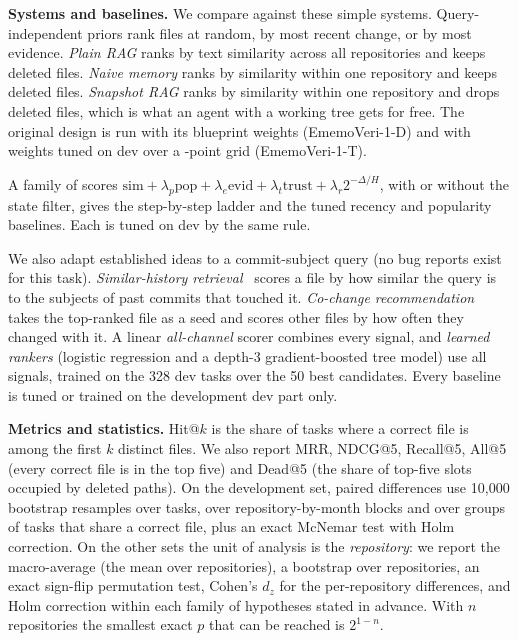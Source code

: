 \documentclass[runningheads]{llncs}
\newcommand{\sys}{EmemoVeri}
\begin{document}
\textbf{Systems and baselines.} We compare against these simple systems. Query-independent priors rank files at random, by most recent change, or by most evidence. \emph{Plain RAG} ranks by text similarity across all repositories and keeps deleted files. \emph{Naive memory} ranks by similarity within one repository and keeps deleted files. \emph{Snapshot RAG} ranks by similarity within one repository and drops deleted files, which is what an agent with a working tree gets for free. The original design is run with its blueprint weights (\sys{}-1-D) and with weights tuned on dev over a \gridSize{}-point grid (\sys{}-1-T).

A family of scores $\mathrm{sim}+\lambda_p\mathrm{pop}+\lambda_e\mathrm{evid}+\lambda_t\mathrm{trust}+\lambda_r 2^{-\Delta/H}$, with or without the state filter, gives the step-by-step ladder and the tuned recency and popularity baselines. Each is tuned on dev by the same rule.

We also adapt established ideas to a commit-subject query (no bug reports exist for this task). \emph{Similar-history retrieval}~\cite{zhou2012buglocator} scores a file by how similar the query is to the subjects of past commits that touched it. \emph{Co-change recommendation}~\cite{zimmermann2005mining} takes the top-ranked file as a seed and scores other files by how often they changed with it. A linear \emph{all-channel} scorer combines every signal, and \emph{learned rankers} (logistic regression and a depth-3 gradient-boosted tree model) use all signals, trained on the 328 dev tasks over the 50 best candidates. Every baseline is tuned or trained on the development dev part only.

\textbf{Metrics and statistics.} Hit@$k$ is the share of tasks where a correct file is among the first $k$ distinct files. We also report MRR, NDCG@5, Recall@5, All@5 (every correct file is in the top five) and Dead@5 (the share of top-five slots occupied by deleted paths). On the development set, paired differences use 10{,}000 bootstrap resamples over tasks, over repository-by-month blocks and over groups of tasks that share a correct file, plus an exact McNemar test with Holm correction. On the other sets the unit of analysis is the \emph{repository}: we report the macro-average (the mean over repositories), a bootstrap over repositories, an exact sign-flip permutation test, Cohen's $d_z$ for the per-repository differences, and Holm correction within each family of hypotheses stated in advance. With $n$ repositories the smallest exact $p$ that can be reached is $2^{1-n}$.
\end{document}
